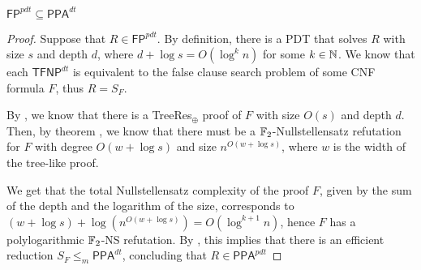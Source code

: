 \begin{theorem}
    \label{final_inclusion}
    $\mathsf{FP}^{pdt} \subseteq \mathsf{PPA}^{dt}$
\end{theorem}

\begin{proof}
 Suppose that $R \in \mathsf{FP}^{pdt}$. By definition, there is a PDT that solves $R$ with size $s$ and depth $d$, where $d+\log s = O(\log^k n)$ for some $k \in \mathbb{N}$. We know that each $\textsf{TFNP}^{dt}$ is equivalent to the false clause search problem of some CNF formula $F$, thus $R = S_F$.
    
 By , we know that there is a \textsf{TreeRes}$_{\oplus}$ proof of $F$ with size $O(s)$ and depth $d$. Then, by theorem , we know that there must be a $\mathbb{F}_2$-Nullstellensatz refutation for $F$ with degree $O(w + \log s)$ and size $n^{O(w + \log s)}$, where $w$ is the width of the tree-like proof.
 
 We get that the total Nullstellensatz complexity of the proof $F$, given by the sum of the depth and the logarithm of the size, corresponds to $(w + \log s) + \log(n^{O(w + \log s)}) = O(\log^{k+1} n)$, hence $F$ has a polylogarithmic $\mathbb{F}_2$-\textsf{NS} refutation. By , this implies that there is an efficient reduction $S_F \leq_m \mathsf{PPA}^{dt}$, concluding that $R \in \mathsf{PPA}^{pdt}$
\end{proof}
   

\cleardoublepage
